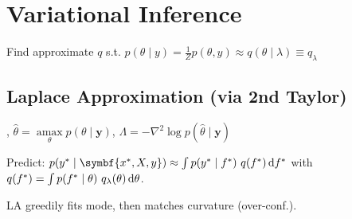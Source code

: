 
\section{Variational Inference}\label{sec:variational-inference}


Find approximate $q$ s.t. $p(\theta \mid y) = \frac1Z p(\theta, y) \approx q(\theta \mid \lambda) \equiv q_\lambda$

\subsection{Laplace Approximation \enskip\mdseries (via 2nd Taylor)}

,
$\hat\theta = \mathop{\mathrm{amax}}\limits_{\theta} p(\theta \mid \symbf{y})$,
$\Lambda = - \nabla^2 \log p(\hat\theta \mid \symbf{y})$

Predict: $p(y^\ast \mid \symbf{x^\ast, X, y}) \approx \int p(y^\ast \mid f^\ast)\ q(f^\ast) \diff f^\ast$
with $q(f^\ast) = \int p(f^\ast \mid \theta)\ q_\lambda(\theta) \diff\theta$.

LA greedily fits mode, then matches curvature (over-conf.).

